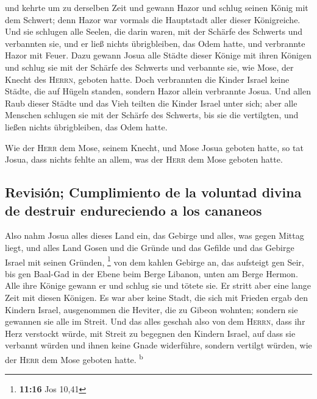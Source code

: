  und kehrte um zu derselben Zeit und gewann Hazor und
schlug seinen König mit dem Schwert; denn Hazor war vormals die
Hauptstadt aller dieser Königreiche.  Und sie schlugen
alle Seelen, die darin waren, mit der Schärfe des Schwerts und
verbannten sie, und er ließ nichts übrigbleiben, das Odem hatte, und
verbrannte Hazor mit Feuer.  Dazu gewann Josua alle
Städte dieser Könige mit ihren Königen und schlug sie mit der Schärfe
des Schwerts und verbannte sie, wie Mose, der Knecht des \textsc{Herrn},
geboten hatte.  Doch verbrannten die Kinder Israel keine
Städte, die auf Hügeln standen, sondern Hazor allein verbrannte Josua.
 Und allen Raub dieser Städte und das Vieh teilten die
Kinder Israel unter sich; aber alle Menschen schlugen sie mit der
Schärfe des Schwerts, bis sie die vertilgten, und ließen nichts
übrigbleiben, das Odem hatte.

 Wie der \textsc{Herr} dem Mose, seinem Knecht, und Mose
Josua geboten hatte, so tat Josua, dass nichts fehlte an allem, was der
\textsc{Herr} dem Mose geboten hatte.

\hypertarget{revisiuxf3n-cumplimiento-de-la-voluntad-divina-de-destruir-endureciendo-a-los-cananeos}{%
\subsection{Revisión; Cumplimiento de la voluntad divina de destruir
endureciendo a los
cananeos}\label{revisiuxf3n-cumplimiento-de-la-voluntad-divina-de-destruir-endureciendo-a-los-cananeos}}

 Also nahm Josua alles dieses Land ein, das Gebirge und
alles, was gegen Mittag liegt, und alles Land Gosen und die Gründe und
das Gefilde und das Gebirge Israel mit seinen Gründen, \footnote{\textbf{11:16}
  Jos 10,41}  von dem kahlen Gebirge an, das aufsteigt
gen Seir, bis gen Baal-Gad in der Ebene beim Berge Libanon, unten am
Berge Hermon. Alle ihre Könige gewann er und schlug sie und tötete sie.
 Er stritt aber eine lange Zeit mit diesen Königen.
 Es war aber keine Stadt, die sich mit Frieden ergab den
Kindern Israel, ausgenommen die Heviter, die zu Gibeon wohnten; sondern
sie gewannen sie alle im Streit.  Und das alles geschah
also von dem \textsc{Herrn}, dass ihr Herz verstockt würde, mit Streit
zu begegnen den Kindern Israel, auf dass sie verbannt würden und ihnen
keine Gnade widerführe, sondern vertilgt würden, wie der \textsc{Herr}
dem Mose geboten hatte. \textsuperscript{b}

